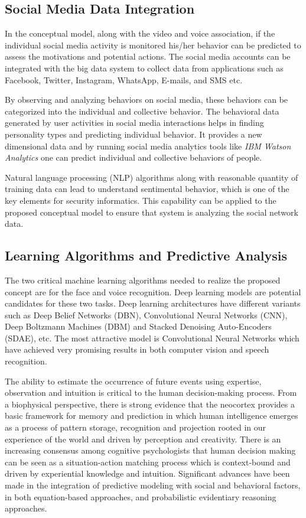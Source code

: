 \documentclass[sigconf]{acmart}
\begin{document}
\subsection{Social Media Data Integration}
In the conceptual model, along with the video and voice association, if the individual social media activity is monitored his/her behavior can be predicted to assess the motivations and potential actions. The social media accounts can be integrated with the big data system to collect data from applications such as Facebook, Twitter, Instagram, WhatsApp, E-mails, and SMS etc.

By observing and analyzing behaviors on social media, these behaviors can be categorized into the individual and collective behavior. The behavioral data generated by user activities in social media interactions  helps in finding personality types and predicting individual behavior. It provides a new dimensional data 
and by running social media analytics tools like \textit{IBM Watson Analytics} one can predict individual and collective behaviors of people.

Natural language processing (NLP) algorithms along with reasonable quantity of training data can lead to understand sentimental behavior, which is one of the key elements for security informatics. This capability can be applied to the proposed conceptual model to ensure that system is analyzing the social network data.

\subsection{Learning Algorithms and Predictive Analysis}
The two critical machine learning algorithms needed to realize the proposed concept are for the face and voice recognition. Deep learning models are potential candidates for these two tasks. Deep learning architectures have different variants such as Deep Belief Networks (DBN)\cite{Hinton2009}, Convolutional Neural Networks (CNN)\cite{NIPS2012-4824}, Deep Boltzmann Machines (DBM)\cite{pmlr-v9-salakhutdinov10a} and Stacked Denoising Auto-Encoders (SDAE)\cite{Vincent2010}, etc. The most attractive model is Convolutional Neural Networks which have achieved very promising results in both computer vision and speech recognition.

 The ability to estimate the occurrence of future events using expertise, observation and intuition is critical to the human decision-making process. From a biophysical perspective, there is strong evidence that the neocortex provides a basic framework for memory and prediction in which human intelligence emerges as a process of pattern storage, recognition and projection rooted in our experience of the world and driven by perception and creativity. There is an increasing consensus among cognitive psychologists that human decision making can be seen as a situation-action matching process which is context-bound and driven by experiential knowledge and intuition. Significant advances have been made in the integration of predictive modeling with social and behavioral factors, in both equation-based approaches, and probabilistic evidentiary reasoning approaches\cite{Sanfilippo2012}. 
\end{document}

